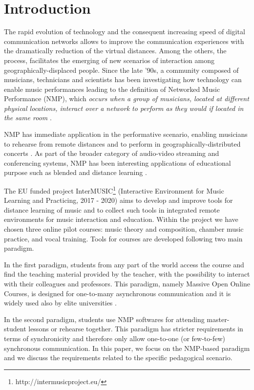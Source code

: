 \documentclass[conference]{IEEEtran}
\begin{document}
\section{Introduction}\label{sec:introduction}

The rapid evolution of technology and the consequent increasing speed of digital communication networks allows to improve the communication experiences with the dramatically reduction of the virtual distances. Among the others, the process, facilitates the emerging of new scenarios of interaction among geogra\-phically-displaced people. Since the late '90s, a community composed of musicians, technicians and  scientists has been investigating how technology can enable music performances leading to the definition of Networked Music Performance (NMP), which \textit{occurs when a group of musicians, located at different physical locations, interact over a network to perform as they would if located in the same room} \cite{Lazzaro2001}.

NMP has immediate application in the performative scenario, enabling musicians to rehearse from remote distances and to perform in geographically-distributed concerts \cite{barbosa2003displaced}. As part of the broader category of audio-video streaming and conferencing systems, NMP has been interesting applications of educational purpose such as blended and distance learning \cite{IorwerthNMP2015}.    


The EU funded project InterMUSIC\footnote{http://intermusicproject.eu/} (Interactive Environment for Music Learning and Practicing, 2017 - 2020) aims to develop and improve tools for distance learning of music and to collect such tools in integrated remote environments for music interaction and education. Within the project we have chosen three online pilot courses: music theory and composition, chamber music practice, and vocal training. Tools for courses are developed following two main paradigm. %

In the first paradigm, students from any part of the world access the course and find the teaching material provided by the teacher, with the possibility to interact with their colleagues and professors. This paradigm, namely Massive Open Online Courses, is designed for one-to-many asynchronous communication and it is widely used also by elite universities \cite{MOOCS}.

In the second paradigm, students use NMP softwares for attending master-student lessons or rehearse together. This paradigm has stricter requirements in terms of synchronicity and therefore only allow one-to-one (or few-to-few) synchronous communication. In this paper, we focus on the NMP-based paradigm and we discuss the  requirements related to the specific pedagogical scenario.
\end{document}
